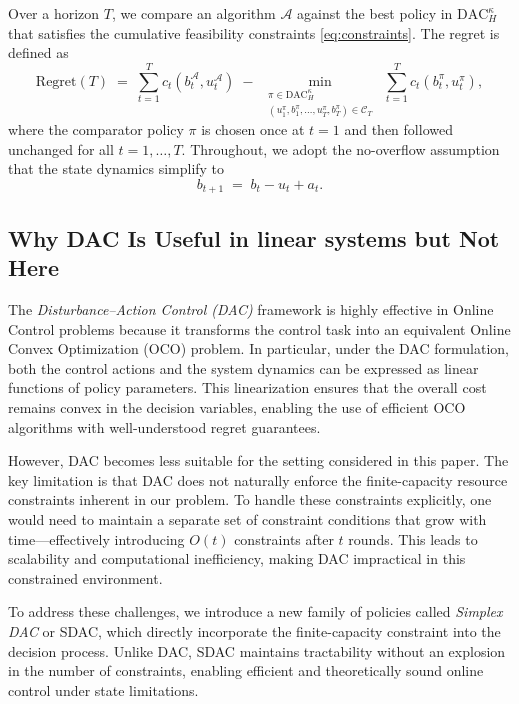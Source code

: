 \documentclass[11pt]{article}
\begin{document}
Over a horizon \(T\), we compare an algorithm \(\mathcal{A}\) against the best policy in \(\mathrm{DAC}_H^\kappa\) that satisfies the cumulative feasibility constraints \eqref{eq:constraints}. The regret is defined as
\begin{equation}\label{eq:dac-regret}
\mathrm{Regret}(T)
\;=\;
\sum_{t=1}^T  c_t\!\left(b_t^\mathcal{A},u_t^\mathcal{A}\right)
\;-\;
\min_{\substack{\pi\in \mathrm{DAC}_H^\kappa\\ (u_1^\pi,b_1^\pi,\ldots,u_T^\pi,b_T^\pi)\in \mathcal{C}_T}}
\; \sum_{t=1}^T  c_t\!\left(b_t^\pi,u_t^\pi\right),
\end{equation}
where the comparator policy \(\pi\) is chosen once at \(t=1\) and then followed unchanged for all \(t=1,\dots,T\). Throughout, we adopt the no-overflow assumption that the state dynamics simplify to
\begin{equation}
\label{eq:evo-no-saturation-recall}
b_{t+1} \;=\; b_t - u_t + a_t .
\end{equation}


\subsection{Why DAC Is Useful in linear systems but Not Here}
\label{sec:why-dac-new}

The \emph{Disturbance–Action Control (DAC)} framework is highly effective in Online Control problems because it transforms the control task into an equivalent Online Convex Optimization (OCO) problem.  
In particular, under the DAC formulation, both the control actions and the system dynamics can be expressed as linear functions of policy parameters.  
This linearization ensures that the overall cost remains convex in the decision variables, enabling the use of efficient OCO algorithms with well-understood regret guarantees.

However, DAC becomes less suitable for the setting considered in this paper.  
The key limitation is that DAC does not naturally enforce the finite-capacity resource constraints inherent in our problem.
To handle these constraints explicitly, one would need to maintain a separate set of constraint conditions that grow with time—effectively introducing $O(t)$ constraints after $t$ rounds.  
This leads to scalability and computational inefficiency, making DAC impractical in this constrained environment.

To address these challenges, we introduce a new family of policies called \emph{Simplex DAC} or SDAC, which directly incorporate the finite-capacity constraint into the decision process.  
Unlike DAC, SDAC maintains tractability without an explosion in the number of constraints, enabling efficient and theoretically sound online control under state limitations.
\end{document}
